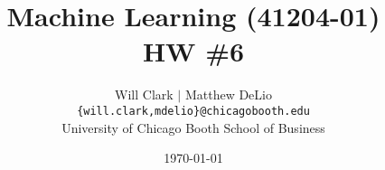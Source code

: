 



\title{Machine Learning (41204-01)\\HW \#6}
\author{Will Clark $\vert$ Matthew DeLio \\
\texttt{\{will.clark,mdelio\}@chicagobooth.edu} \\
University of Chicago Booth School of Business}
\date{\today}
\maketitle

\begin{appendices}

\clearpage

%

\end{appendices}



% 



